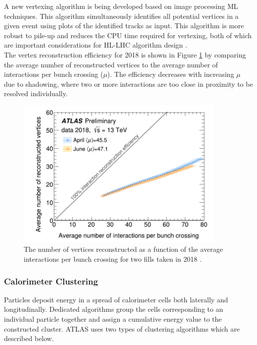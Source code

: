 A new vertexing algorithm is being developed based on image processing ML techniques. This algorithm simultaneously identifies all potential vertices in a given event using plots of the identified tracks as input. This algorithm is more robust to pile-up and reduces the CPU time required for vertexing, both of which are important considerations for HL-LHC algorithm design \cite{tracking_improvements}.\\

The vertex reconstruction efficiency for 2018 is shown in Figure \ref{fig:vertex} by comparing the average number of reconstructed vertices to the average number of interactions per bunch crossing ($\mu$). The efficiency decreases with increasing $\mu$ due to shadowing, where two or more interactions are too close in proximity to be resolved individually.

\begin{figure}[h]
    \centering
    \includegraphics[width=4in]{figures/chapter3/vertex_eff.png}
    \caption{The number of vertices reconstructed as a function of the average interactions per bunch crossing for two fills taken in 2018 \cite{vertex_pub}.}
    \label{fig:vertex}
\end{figure}

\subsubsection{Calorimeter Clustering}\label{sec:clustering}
Particles deposit energy in a spread of calorimeter cells both laterally and longitudinally. Dedicated algorithms group the cells corresponding to an individual particle together and assign a cumulative energy value to the constructed cluster. ATLAS uses two types of clustering algorithms which are described below.\\

